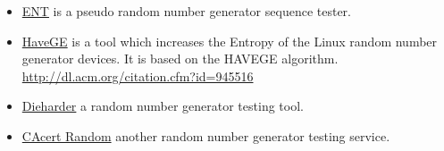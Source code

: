 \begin{itemize}
\item \href{http://www.fourmilab.ch/random/}{ENT} is a pseudo random number generator sequence tester.  
\item \href{http://www.issihosts.com/haveged/}{HaveGE} is a tool which increases the Entropy of the Linux random number generator devices. It is based on the HAVEGE algorithm. \url{http://dl.acm.org/citation.cfm?id=945516}
\item \href{http://www.phy.duke.edu/~rgb/General/dieharder.php}{Dieharder} a random number generator testing tool.
\item \href{http://www.cacert.at/random/}{CAcert Random} another random number generator testing service.

\end{itemize}



